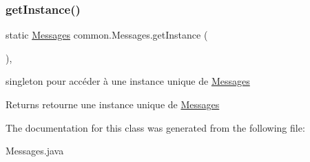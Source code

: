 \subsubsection{\texorpdfstring{get\+Instance()}{getInstance()}}
{\footnotesize\ttfamily static \hyperlink{classcommon_1_1Messages}{Messages} common.\+Messages.\+get\+Instance (\begin{DoxyParamCaption}{ }\end{DoxyParamCaption})\hspace{0.3cm}{\ttfamily [inline]}, {\ttfamily [static]}}



singleton pour accéder à une instance unique de \hyperlink{classcommon_1_1Messages}{Messages} 

\begin{DoxyReturn}{Returns}
retourne une instance unique de \hyperlink{classcommon_1_1Messages}{Messages} 
\end{DoxyReturn}


The documentation for this class was generated from the following file\+:\begin{DoxyCompactItemize}
\item 
Messages.\+java\end{DoxyCompactItemize}
